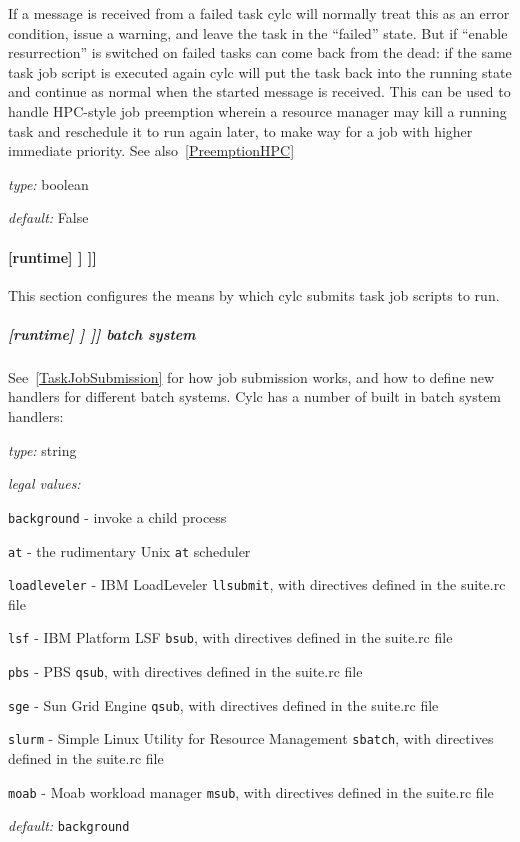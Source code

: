 If a message is received from a failed task cylc will normally treat
this as an error condition, issue a warning, and leave the task in the
``failed'' state.  But if ``enable resurrection'' is switched on failed
tasks can come back from the dead: if the same task job script is
executed again cylc will put the task back into the running state and
continue as normal when the started message is received. This can be
used to handle HPC-style job preemption wherein a resource manager may
kill a running task and reschedule it to run again later, to make way
for a job with higher immediate priority. See also~\ref{PreemptionHPC}
\begin{myitemize}
\item {\em type:} boolean
\item {\em default:} False
\end{myitemize}

\paragraph[{[[[}job{]]]}]{[runtime] \textrightarrow [[\_\_NAME\_\_]] \textrightarrow [[[job]]]}

This section configures the means by which cylc submits task job scripts to run.

\subparagraph[batch system]{[runtime] \textrightarrow [[\_\_NAME\_\_]] \textrightarrow [[[job]]] \textrightarrow batch system}
\label{RuntimeJobSubMethods}

See~\ref{TaskJobSubmission} for how job submission works, and how to define
new handlers for different batch systems. Cylc has a number of built in batch system handlers:
\begin{myitemize}
\item {\em type:} string
\item {\em legal values:}
   \begin{myitemize}
       \item \lstinline=background= - invoke a child process
       \item \lstinline=at= - the rudimentary Unix \lstinline=at= scheduler
       \item \lstinline=loadleveler= - IBM LoadLeveler \lstinline=llsubmit=, with directives defined in the suite.rc file
       \item \lstinline=lsf= - IBM Platform LSF \lstinline=bsub=, with directives defined in the suite.rc file
       \item \lstinline=pbs= - PBS \lstinline=qsub=, with directives defined in the suite.rc file
       \item \lstinline=sge= - Sun Grid Engine \lstinline=qsub=, with directives defined in the suite.rc file
       \item \lstinline=slurm= - Simple Linux Utility for Resource Management \lstinline=sbatch=, with directives defined in the suite.rc file
       \item \lstinline=moab= - Moab workload manager \lstinline=msub=, with directives defined in the suite.rc file
   \end{myitemize}
\item {\em default:} \lstinline=background=
\end{myitemize}

